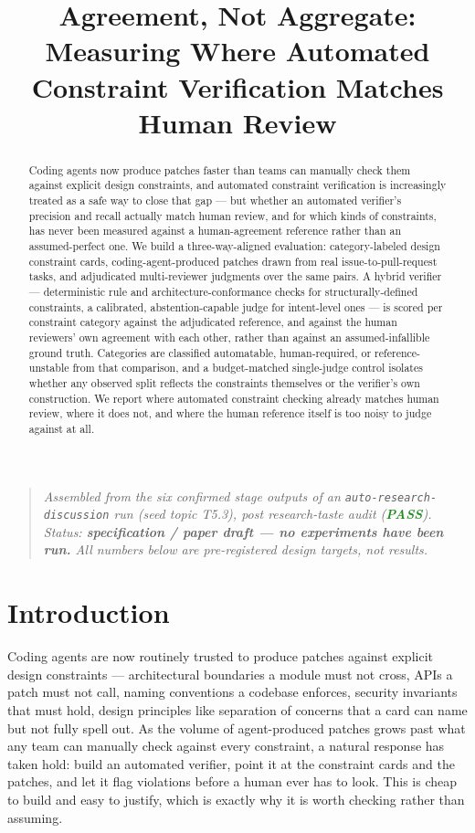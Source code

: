 \documentclass[11pt]{article}
\title{\textbf{Agreement, Not Aggregate:\\ Measuring Where Automated Constraint Verification Matches Human Review}}
\author{}
\date{}
\begin{document}
\maketitle
\vspace{-2em}

\begin{quote}
\small\textit{Assembled from the six confirmed stage outputs of an \texttt{auto-research-discussion} run (seed topic T5.3), post research-taste audit (\textcolor{ForestGreen}{\textbf{PASS}}). Status: \textbf{specification / paper draft --- no experiments have been run.} All numbers below are pre-registered design targets, not results.}
\end{quote}

\begin{abstract}
Coding agents now produce patches faster than teams can manually check them against explicit design constraints, and automated constraint verification is increasingly treated as a safe way to close that gap --- but whether an automated verifier's precision and recall actually match human review, and for which kinds of constraints, has never been measured against a human-agreement reference rather than an assumed-perfect one. We build a three-way-aligned evaluation: category-labeled design constraint cards, coding-agent-produced patches drawn from real issue-to-pull-request tasks, and adjudicated multi-reviewer judgments over the same pairs. A hybrid verifier --- deterministic rule and architecture-conformance checks for structurally-defined constraints, a calibrated, abstention-capable judge for intent-level ones --- is scored per constraint category against the adjudicated reference, and against the human reviewers' own agreement with each other, rather than against an assumed-infallible ground truth. Categories are classified automatable, human-required, or reference-unstable from that comparison, and a budget-matched single-judge control isolates whether any observed split reflects the constraints themselves or the verifier's own construction. We report where automated constraint checking already matches human review, where it does not, and where the human reference itself is too noisy to judge against at all.
\end{abstract}

\section{Introduction}

Coding agents are now routinely trusted to produce patches against explicit design constraints --- architectural boundaries a module must not cross, APIs a patch must not call, naming conventions a codebase enforces, security invariants that must hold, design principles like separation of concerns that a card can name but not fully spell out. As the volume of agent-produced patches grows past what any team can manually check against every constraint, a natural response has taken hold: build an automated verifier, point it at the constraint cards and the patches, and let it flag violations before a human ever has to look. This is cheap to build and easy to justify, which is exactly why it is worth checking rather than assuming.
\end{document}
